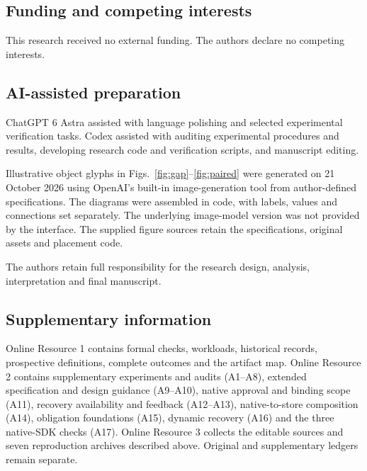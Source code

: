 \documentclass[pdflatex,sn-basic]{sn-jnl}
\begin{document}
\subsection*{Funding and competing interests}
This research received no external funding. The authors declare no competing interests.

\subsection*{AI-assisted preparation}
ChatGPT 6 Astra assisted with language polishing and selected experimental verification tasks. Codex assisted with auditing experimental procedures and results, developing research code and verification scripts, and manuscript editing.

Illustrative object glyphs in Figs.~\ref{fig:gap}--\ref{fig:paired} were generated on 21 October 2026 using OpenAI's built-in image-generation tool from author-defined specifications. The diagrams were assembled in code, with labels, values and connections set separately. The underlying image-model version was not provided by the interface. The supplied figure sources retain the specifications, original assets and placement code.

The authors retain full responsibility for the research design, analysis, interpretation and final manuscript.

\subsection*{Supplementary information}
Online Resource 1 contains formal checks, workloads, historical records, prospective definitions, complete outcomes and the artifact map. Online Resource 2 contains supplementary experiments and audits (A1--A8), extended specification and design guidance (A9--A10), native approval and binding scope (A11), recovery availability and feedback (A12--A13), native-to-store composition (A14), obligation foundations (A15), dynamic recovery (A16) and the three native-SDK checks (A17). Online Resource 3 collects the editable sources and seven reproduction archives described above. Original and supplementary ledgers remain separate.


\end{document}
